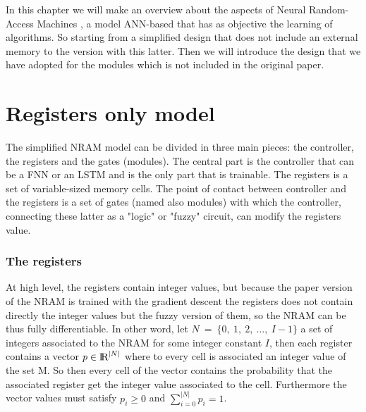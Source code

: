 In this chapter we will make an overview about the aspects of Neural Random-Access Machines \cite{NRAM:2015}, a model ANN-based that has as objective the learning of algorithms. So starting from a simplified design that does not include an external memory to the version with this latter. Then we will introduce the design that we have adopted for the modules which is not included in the original paper. 


\section{Registers only model}
The simplified NRAM model can be divided in three main pieces: the controller, the registers and the gates (modules). The central part is the controller that can be a FNN or an LSTM and is the only part that is trainable. The registers is a set of variable-sized memory cells. The point of contact between controller and the registers is a set of gates (named also modules) with which the controller, connecting these latter as a "logic" or "fuzzy" circuit, can modify the registers value. 

\subsubsection*{The registers}
At high level, the registers contain integer values, but because the paper version of the NRAM is trained with the gradient descent the registers does not contain directly the integer values but the fuzzy version of them, so the NRAM can be thus fully differentiable. In other word, let $N\ =\ \{0,\ 1,\ 2,\ \dots,\ I - 1\}$ a set of integers associated to the NRAM for some integer constant $I$, then each register contains a vector $p \in \textrm{I\!R}^{|N|}$ where to every cell is associated an integer value of the set M. So then every cell of the vector contains the probability that the associated register get the integer value associated to the cell. Furthermore the vector values must satisfy $p_{i} \geq 0$ and $\sum\limits_{i = 0}^{|N|} p_{i} = 1$.

